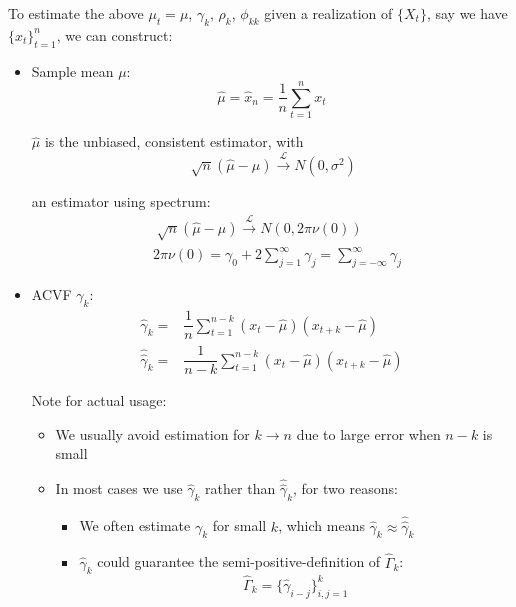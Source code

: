     To estimate the above $ \mu _t=\mu $, $ \gamma _k $, $ \rho _k $, $ \phi _{kk} $ given a realization of $ \{X_t\} $, say we have $ \{x_t\}_{t=1}^n $, we can construct:
    \begin{itemize}[topsep=2pt,itemsep=0pt]
        \item Sample mean $ \mu  $:
        \begin{equation}
            \hat{\mu }=\hat{x}_n=\dfrac{1}{n}\sum_{t=1}^nx_t 
        \end{equation}

        $ \hat{\mu } $ is the unbiased, consistent estimator, with
        \[
            \sqrt[]{n}(\hat{\mu }-\mu )\xrightarrow[]{\mathscr{L}} N(0,\sigma ^2) 
        \]
        
        an estimator using spectrum:
        \begin{align}
            &\sqrt[]{n}(\hat{\mu }-\mu )\xrightarrow[]{\mathscr{L}} N(0,2\pi \nu (0))\\
            &2\pi \nu (0)=\gamma _0+2\sum_{j=1}^\infty \gamma _j=\sum_{j=-\infty}^\infty \gamma _j 
        \end{align}
        
        \item ACVF $ \gamma _k $:
        \begin{align*}
            \hat{\gamma }_k=&\dfrac{1}{n}\sum_{t=1}^{n-k}(x_t-\hat{\mu })(x_{t+k}-\hat{\mu }) \\
            \hat{\hat{\gamma }}_k=&\dfrac{1}{n-k}\sum_{t=1}^{n-k}(x_t-\hat{\mu })(x_{t+k}-\hat{\mu }) 
        \end{align*}

        Note for actual usage:
        \begin{itemize}[topsep=2pt,itemsep=0pt]
            \item We usually avoid estimation for $ k\to n $ due to large error when $ n-k $ is small
            \item In most cases we use $ \hat{\gamma }_k $ rather than $ \hat{\hat{\gamma }}_k $, for two reasons:
            \begin{itemize}[topsep=2pt,itemsep=0pt]
                \item We often estimate $ \gamma _k $ for small $ k $, which means $ \hat{\gamma }_k\approx \hat{\hat{\gamma }}_k $
                \item $ \hat{\gamma }_k $ could guarantee the semi-positive-definition of $ \hat{\Gamma }_k $:
                \[
                     \hat{\Gamma }_k=\{\hat{\gamma }_{i-j}\}_{i,j=1}^k
                \]
            \end{itemize}
            

\end{itemize}
\end{itemize}
